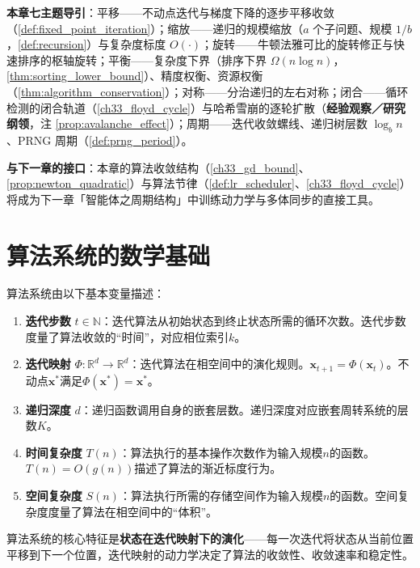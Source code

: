 \begin{definition}
\textbf{本章七主题导引}：平移——不动点迭代与梯度下降的逐步平移收敛（\cref{def:fixed_point_iteration}）；缩放——递归的规模缩放（$a$ 个子问题、规模 $1/b$，\cref{def:recursion}）与复杂度标度 $O(\cdot)$；旋转——牛顿法雅可比的旋转修正与快速排序的枢轴旋转；平衡——复杂度下界（排序下界 $\Omega(n\log n)$，\cref{thm:sorting_lower_bound}）、精度权衡、资源权衡（\cref{thm:algorithm_conservation}）；对称——分治递归的左右对称；闭合——循环检测的闭合轨道（\cref{ch33_floyd_cycle}）与哈希雪崩的逐轮扩散（\textbf{经验观察／研究纲领}，注 \cref{prop:avalanche_effect}）；周期——迭代收敛螺线、递归树层数 $\log_b n$、PRNG 周期（\cref{def:prng_period}）。

\textbf{与下一章的接口}：本章的算法收敛结构（\cref{ch33_gd_bound}、\cref{prop:newton_quadratic}）与算法节律（\cref{def:lr_scheduler}、\cref{ch33_floyd_cycle}）将成为下一章「智能体之周期结构」中训练动力学与多体同步的直接工具。
\end{definition}

\section{算法系统的数学基础}

\begin{definition}[算法系统的基本量]\label{def:algorithm_quantities}
算法系统由以下基本变量描述：
\begin{enumerate}[label=(\roman*)]
    \item \textbf{迭代步数} $t \in \mathbb{N}$：迭代算法从初始状态到终止状态所需的循环次数。迭代步数度量了算法收敛的“时间”，对应相位索引$k$。
    \item \textbf{迭代映射} $\Phi: \mathbb{R}^d \to \mathbb{R}^d$：迭代算法在相空间中的演化规则。$\mathbf{x}_{t+1} = \Phi(\mathbf{x}_t)$。不动点$\mathbf{x}^*$满足$\Phi(\mathbf{x}^*) = \mathbf{x}^*$。
    \item \textbf{递归深度} $d$：递归函数调用自身的嵌套层数。递归深度对应嵌套周转系统的层数$K$。
    \item \textbf{时间复杂度} $T(n)$：算法执行的基本操作次数作为输入规模$n$的函数。$T(n) = O(g(n))$描述了算法的渐近标度行为。
    \item \textbf{空间复杂度} $S(n)$：算法执行所需的存储空间作为输入规模$n$的函数。空间复杂度度量了算法在相空间中的“体积”。
\end{enumerate}
算法系统的核心特征是\textbf{状态在迭代映射下的演化}——每一次迭代将状态从当前位置平移到下一个位置，迭代映射的动力学决定了算法的收敛性、收敛速率和稳定性。
\end{definition}

